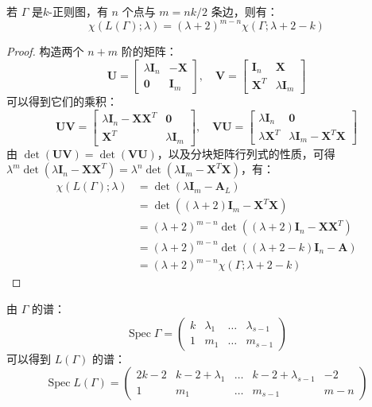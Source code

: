 \begin{theorem}[Sachs 1967]
若 $\Gamma$ 是$k$-正则图，有 $n$ 个点与 $m = nk/2$ 条边，则有：
\[
\chi(L(\Gamma); \lambda) = (\lambda + 2)^{m - n} \chi (\Gamma; \lambda + 2 - k)
\]
\end{theorem}
\begin{proof}
构造两个 $n + m$ 阶的矩阵：
\[
\mathbf{U}=\left[\begin{array}{cc}
\lambda \mathbf{I}_{n} & -\mathbf{X} \\
\mathbf{0} & \mathbf{I}_{m}
\end{array}\right], \quad \mathbf{V}=\left[\begin{array}{cc}
\mathbf{I}_{n} & \mathbf{X} \\
\mathbf{X}^{T} & \lambda \mathbf{I}_{m}
\end{array}\right]
\]
可以得到它们的乘积：
\[
\mathbf{U V}=\left[\begin{array}{cc}
\lambda \mathbf{I}_{n}-\mathbf{X} \mathbf{X}^{T} & \mathbf{0} \\
\mathbf{X}^{T} & \lambda \mathbf{I}_{m}
\end{array}\right], \quad \mathbf{V U}=\left[\begin{array}{cc}
\lambda \mathbf{I}_{n} & \mathbf{0} \\
\lambda \mathbf{X}^{T} & \lambda \mathbf{I}_{m}-\mathbf{X}^{T} \mathbf{X}
\end{array}\right]
\]
由 $\det(\mathbf{U V}) = \det(\mathbf{V U})$，以及分块矩阵行列式的性质，可得 $\lambda^{m} \operatorname{det}\left(\lambda \mathbf{I}_{n}-\mathbf{X} \mathbf{X}^{T}\right)=\lambda^{n} \operatorname{det}\left(\lambda \mathbf{I}_{m}-\mathbf{X}^{T} \mathbf{X}\right)$，有：
\[
\begin{aligned}
\chi(L(\Gamma) ; \lambda) &=\operatorname{det}\left(\lambda \mathbf{I}_{m}-\mathbf{A}_{L}\right) \\
&=\operatorname{det}\left((\lambda+2) \mathbf{I}_{m}-\mathbf{X}^{T} \mathbf{X}\right) \\
&=(\lambda+2)^{m-n} \operatorname{det}\left((\lambda+2) \mathbf{I}_{n}-\mathbf{X} \mathbf{X}^{T}\right) \\
&=(\lambda+2)^{m-n} \operatorname{det}\left((\lambda+2-k) \mathbf{I}_{n}-\mathbf{A}\right) \\
&=(\lambda+2)^{m-n} \chi(\Gamma ; \lambda+2-k)
\end{aligned}
\]
\end{proof}

由 $\Gamma$ 的谱：
\[
\operatorname{Spec} \Gamma=\left(\begin{array}{cccc}
k & \lambda_{1} & \ldots & \lambda_{s-1} \\
1 & m_{1} & \ldots & m_{s-1}
\end{array}\right)
\]
可以得到 $L(\Gamma)$ 的谱：
\[
\operatorname{Spec} L(\Gamma)=\left(\begin{array}{ccccc}
2 k-2 & k-2+\lambda_{1} & \ldots & k-2+\lambda_{s-1} & -2 \\
1 & m_{1} & \ldots & m_{s-1} & m-n
\end{array}\right)
\]


